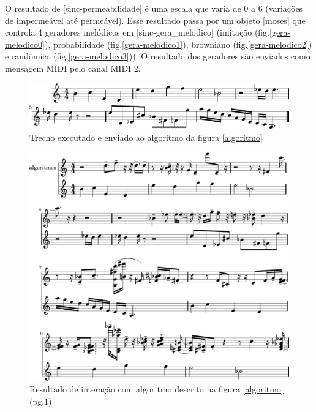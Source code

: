 \documentclass[draft]{ppgmus}
\begin{document}
O resultado de [sinc-permeabilidade] é uma escala que varia de 0 a 6 (variações de impermeável até permeável).
Esse resultado passa por um objeto [moses] que controla 4 geradores melódicos em [sinc-gera\_melodico]
(imitação (fig.\ref{gera-melodico0}), probabilidade (fig.\ref{gera-melodico1}), browniano (fig.\ref{gera-melodico2}) 
e randômico (fig.\ref{gera-melodico3})). O resultado dos geradores são enviados como mensagem MIDI pelo canal MIDI 2.

\begin{figure}
\includegraphics[scale=.5]{base-duo}
\caption{Trecho executado e enviado ao algoritmo da figura \ref{algoritmo} }
\label{base-duo}
\end{figure}



\begin{figure}
\includegraphics[scale=.5]{alg-interativos}
\caption{Resultado de interação com algoritmo descrito na figura \ref{algoritmo} (pg.1)}
\label{alg-interativos}
\end{figure}
\end{document}
